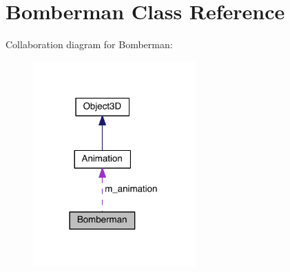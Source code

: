 \hypertarget{class_bomberman}{}\section{Bomberman Class Reference}
\label{class_bomberman}


Collaboration diagram for Bomberman\+:\nopagebreak
\begin{figure}[H]
\begin{center}
\leavevmode
\includegraphics[width=177pt]{class_bomberman__coll__graph}
\end{center}
\end{figure}
